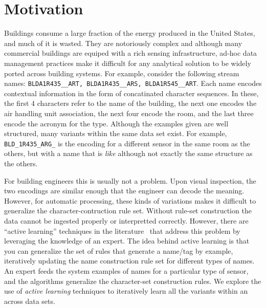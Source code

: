 \section{Motivation}
Buildings consume a large fraction of the energy produced in the United States, and much of it
is wasted\cite{epa}.  They are notoriously complex and although many commercial 
buildings are equiped with a rich sensing infrastructure, ad-hoc data management practices
make it difficult for any analytical solution to be widely ported across building
systems.  For example, consider the following stream names: \texttt{BLDA1R435\_\_ART,
BLDA1R435\_\_ARS, BLDA1R545\_\_ART}. Each name encodes contextual information in the form
of concatinated character sequences. In these, the first 4 characters refer to the 
name of the building, the next one encodes the air handling unit association, the next 
four encode the room,
and the last three encode the acronym for the type.  Although the examples given are well
structured, many variants within the same data set exist.  For example, \texttt{BLD\_1R435\_ARG\_}
is the encoding for a different sensor in the same room as the others, but with a name
that is \emph{like} although not exactly the same structure as the others.

For building engineers this is usually not a problem.  Upon visual inspection, the two
encodings are similar enough that the engineer can decode the meaning.  However, for automatic 
processing, these kinds of variations makes it difficult to generalize the character-contruction
rule set.  Without rule-set construction the data cannot be ingested properly or interpretted
correctly.  However, there are ``active learning'' techniques in the literature~\cite{ms} 
that address this problem by leveraging the knowledge of an expert. The idea behind active learning
is that you can generalize the set of rules that generate a name/tag by example, iteratively
updating the name construction rule set for different types of names.  An expert feeds
the system examples of names for a particular type of sensor, and the algorithms generalize the
character-set construction rules.
We explore the use
of \emph{active learning} techniques to iteratively learn all the variants within an across
data sets.

%


